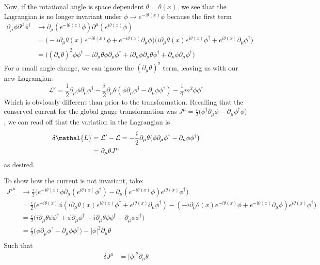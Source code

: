 \documentclass[12pt]{article}
\newcommand{\delmu}{\partial_{\mu}}
\newcommand{\delMu}{\partial^{\mu}}
\newcommand{\+}{\dagger}
\begin{document}
Now, if the rotational angle is space dependent $\theta = \theta(x)$, we see
that the Lagrangian is no longer invariant under $\phi \to e^{-i\theta(x)}\phi$
because the first term
\begin{align*}
    \delmu\phi\delMu\phi^{\dagger} &\to
    \delmu(e^{-i\theta(x)}\phi)\delMu(e^{i\theta(x)}\phi) \\ 
                                   &=
    \big(-i\delmu\theta(x)e^{-i\theta(x)}\phi + e^{-i\theta(x)}\delmu\phi \big)
    \big(i\delmu\theta(x)e^{i\theta(x)}\phi^{\dagger} +
    e^{i\theta(x)}\delmu\phi^{\dagger} \big) \\
                                   &=
    \big(
        (\delmu\theta)^2\phi\phi^{\+} -i\delmu\theta\phi\delmu\phi^{\+}
        + i\delmu\phi\delmu\theta\phi^{\+} + \delmu\phi\delmu\phi^{\+}
    \big)
\end{align*}
For a small angle change, we can ignore the $(\delmu\theta)^2$ term, leaving us
with our new Lagrangian:
\begin{equation*}
    \mathcal{L'} = 
    \frac{1}{2}\delmu\phi\delmu\phi^{\+} -
    \frac{i}{2}\delmu\theta(\phi\delmu\phi^{\+} - \delmu\phi\phi^{\+})
    - \frac{1}{2}m^2\phi\phi^{\+}
\end{equation*}
Which is obviously different than prior to the transformation. Recalling that 
the conserved current for the global gauge transformation was $J^{\mu} =
\frac{i}{2}\big(\phi^{\+}\delmu\phi - \delmu\phi^{\+}\phi\big)$, we can 
read off that the variation in the Lagrangian is
\begin{align*}
    \delta\mathal{L} &= \mathcal{L'} - \mathcal{L} = 
    - \frac{i}{2}\delmu\theta(\phi\delmu\phi^{\+} - \delmu\phi\phi^{\+}) \\
                     &= \delmu\theta J^{\mu}
\end{align*}
as desired.

To show how the current is not invariant, take:
\begin{align*}
    J'^{\mu} &\to \frac{i}{2}\big(e^{-i\theta(x)}\phi \delmu
    (e^{i\theta(x)}\phi^{\+}) - \delmu (e^{-i\theta(x)}\phi)e^{i\theta(x)}\phi^{\+} \big) \\
            &= \frac{i}{2} \big(
                e^{-i\theta(x)}\phi(i\delmu\theta(x)e^{i\theta(x)}\phi^{\+} + 
                e^{i\theta(x)}\delmu\phi^{\+}) -
                (-i\delmu\theta(x)e^{-i\theta(x)}\phi +
                e^{-i\theta(x)}\delmu\phi)e^{i\theta(x)}\phi^{\+}
            \big) \\
            &= \frac{i}{2} \big(
                i\delmu\theta\phi\phi^{\+} + \phi\delmu\phi^{\+} +
                i\delmu\theta\phi\phi^{\+} - \delmu\phi\phi^{\+}
            \big) \\
            &= \frac{i}{2}\big(\phi\delmu\phi^{\+} - \delmu\phi\phi^{\+}\big) 
            - |\phi|^2\delmu\theta \\
\end{align*}
Such that
\begin{align*}
    \delta J^{\mu} &= |\phi|^2\delmu\theta
\end{align*}
\end{document}
